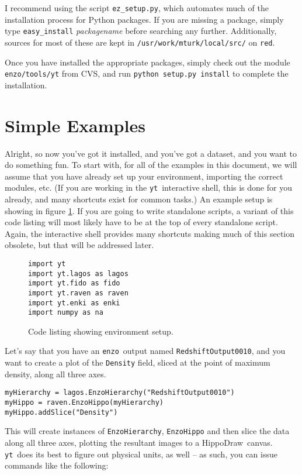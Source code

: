 \documentclass{article}
\newcommand{\enzo}{\texttt{enzo}}
\newcommand{\yt}{\texttt{yt}}
\newcommand{\hd}{HippoDraw}
\begin{document}
I recommend using the script \texttt{ez\_setup.py}, which automates much of the
installation process for Python packages.  If you are missing a package, simply
type \texttt{easy\_install} \textit{packagename} before searching any further.
Additionally, sources for most of these are kept in
\texttt{/usr/work/mturk/local/src/} on \texttt{red}.

Once you have installed the appropriate packages, simply check out the module
\texttt{enzo/tools/yt} from CVS, and run \texttt{python setup.py install} to
complete the installation.

\clearpage
\section{Simple Examples}

Alright, so now you've got it installed, and you've got a dataset, and you want to
do something fun.  To start with, for all of the examples in this document, we will
assume that you have already set up your environment, importing the correct
modules, etc.  (If you are working in the \yt\ interactive shell, this is done for
you already, and many shortcuts exist for common tasks.)  
An example setup is showing in figure \ref{env_setup}.  If you are going to write
standalone scripts, a variant of this code listing will most likely have to be at
the top of every standalone script.  Again, the interactive shell provides many
shortcuts making much of this section obsolete, but that will be addressed later.

\begin{figure}[tbh!]
\begin{verbatim}
import yt
import yt.lagos as lagos
import yt.fido as fido
import yt.raven as raven
import yt.enki as enki
import numpy as na
\end{verbatim}
\caption{\label{env_setup}Code listing showing environment setup.}
\end{figure}

Let's say that you have an \enzo\ output named \texttt{RedshiftOutput0010}, and you
want to create a plot of the \texttt{Density} field, sliced at the point of maximum
density, along all three axes.

\begin{verbatim}
myHierarchy = lagos.EnzoHierarchy("RedshiftOutput0010")
myHippo = raven.EnzoHippo(myHierarchy)
myHippo.addSlice("Density")
\end{verbatim}

This will create instances of \texttt{EnzoHierarchy}, \texttt{EnzoHippo} and then
slice the data along all three axes, plotting the resultant images to a \hd\
canvas.  \yt\ does its best to figure out physical units, as well -- as such, you
can issue commands like the following:
\end{document}
